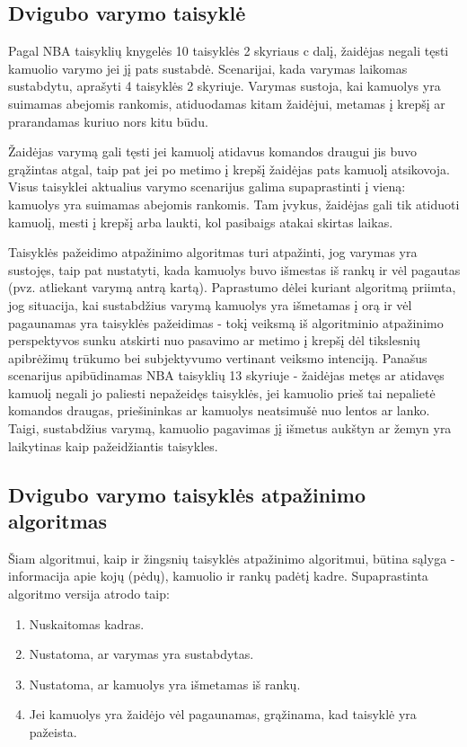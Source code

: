 \documentclass{VUMIFPSbakalaurinis}
\begin{document}
\subsection{Dvigubo varymo taisyklė}
Pagal NBA taisyklių knygelės 10 taisyklės 2 skyriaus c dalį, žaidėjas negali tęsti kamuolio varymo jei jį pats sustabdė. Scenarijai, kada varymas laikomas sustabdytu, aprašyti 4 taisyklės 2 skyriuje. Varymas sustoja, kai kamuolys yra suimamas abejomis rankomis, atiduodamas kitam žaidėjui, metamas į krepšį ar prarandamas kuriuo nors kitu būdu. 

Žaidėjas varymą gali tęsti jei kamuolį atidavus komandos draugui jis buvo grąžintas atgal, taip pat jei po metimo į krepšį žaidėjas pats kamuolį atsikovoja. Visus taisyklei aktualius varymo scenarijus galima supaprastinti į vieną: kamuolys yra suimamas abejomis rankomis. Tam įvykus, žaidėjas gali tik atiduoti kamuolį, mesti į krepšį arba laukti, kol pasibaigs atakai skirtas laikas. 

Taisyklės pažeidimo atpažinimo algoritmas turi atpažinti, jog varymas yra sustojęs, taip pat nustatyti, kada kamuolys buvo išmestas iš rankų ir vėl pagautas (pvz. atliekant varymą antrą kartą). Paprastumo dėlei kuriant algoritmą priimta, jog situacija, kai sustabdžius varymą kamuolys yra išmetamas į orą ir vėl pagaunamas yra taisyklės pažeidimas - tokį veiksmą iš algoritminio atpažinimo perspektyvos sunku atskirti nuo pasavimo ar metimo į krepšį dėl tikslesnių apibrėžimų trūkumo bei subjektyvumo vertinant veiksmo intenciją. Panašus scenarijus apibūdinamas NBA taisyklių 13 skyriuje - žaidėjas metęs ar atidavęs kamuolį negali jo paliesti nepažeidęs taisyklės, jei kamuolio prieš tai nepalietė komandos draugas, priešininkas ar kamuolys neatsimušė nuo lentos ar lanko. Taigi, sustabdžius varymą, kamuolio pagavimas jį išmetus aukštyn ar žemyn yra laikytinas kaip pažeidžiantis taisykles. 

\subsection{Dvigubo varymo taisyklės atpažinimo algoritmas}

Šiam algoritmui, kaip ir žingsnių taisyklės atpažinimo algoritmui, būtina sąlyga - informacija apie kojų (pėdų), kamuolio ir rankų padėtį kadre. Supaprastinta algoritmo versija atrodo taip: 

\begin{enumerate}
 	\item Nuskaitomas kadras.
 	\item Nustatoma, ar varymas yra sustabdytas.
 	\item Nustatoma, ar kamuolys yra išmetamas iš rankų.
 	\item Jei kamuolys yra žaidėjo vėl pagaunamas, grąžinama, kad taisyklė yra pažeista.
\end{enumerate}
\end{document}
